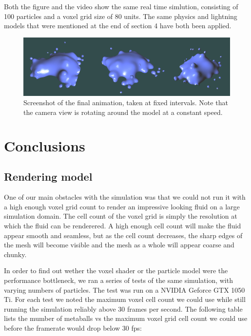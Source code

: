 \documentclass{article}
\begin{document}
\begin{multicols}{2}
        Both the figure and the video show the same real time simlution, consisting of 100 particles and a voxel grid size of 80 units.
        The same physics and lightning models that were mentioned at the end of section 4 have both been applied.

        \begin{figure}[H]
        	\begin{minipage}[b]{0.5\textwidth}
	            \includegraphics[width=\linewidth]{img/result-animation.png}
				\caption{Screenshot of the final animation, taken at fixed intervals. Note that the camera view is rotating around the model at a constant speed.}
				\label{fig:result-animation}
        	\end{minipage}
        \end{figure}

    \section{Conclusions}
    
        \subsection{Rendering model}
        
        One of our main obstacles with the simulation was that we could not run it with a high enough voxel grid count to render an impressive looking fluid on a large simulation domain.
        The cell count of the voxel grid is simply the resolution at which the fluid can be renderered.
        A high enough cell count will make the fluid appear smooth and seamless, but as the cell count decreases, the sharp edges of the mesh will become visible and the mesh as a whole will appear coarse and chunky.

        In order to find out wether the voxel shader or the particle model were the performance bottleneck, we ran a series of tests of the same simulation, with varying numbers of particles.
        The test was run on a NVIDIA Geforce GTX 1050 Ti.
        For each test we noted the maximum voxel cell count we could use while still running the simulation reliably above 30 frames per second.
        The following table lists the mumber of metaballs vs the maximum voxel grid cell count we could use before the framerate would drop below 30 fps:


\end{multicols}
\end{document}
